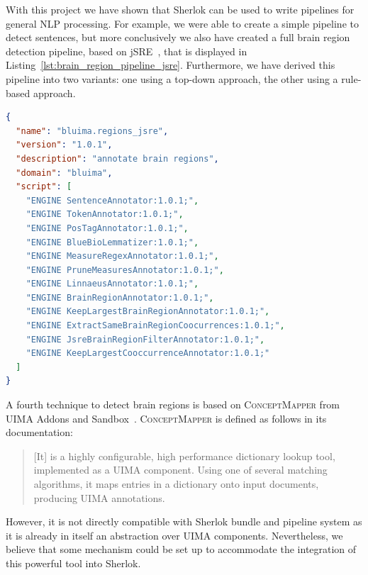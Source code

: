 \documentclass{article}
\newcommand{\ID}[1]{{\textsc{#1}}}
\begin{document}
With this project we have shown that Sherlok can be used to write pipelines for general NLP
processing. For example, we were able to create a simple pipeline to detect sentences, but more
conclusively we also have created a full brain region detection pipeline, based on
jSRE~\cite{jsre_2006}, that is displayed in Listing~\ref{lst:brain_region_pipeline_jsre}.
Furthermore, we have derived this pipeline into two variants: one using a top-down approach, the
other using a rule-based approach.

\begin{lstlisting}[float,language=json,
                   caption=jSRE brain region pipeline,
                   label=lst:brain_region_pipeline_jsre]
{
  "name": "bluima.regions_jsre",
  "version": "1.0.1",
  "description": "annotate brain regions",
  "domain": "bluima",
  "script": [
    "ENGINE SentenceAnnotator:1.0.1;",
    "ENGINE TokenAnnotator:1.0.1;",
    "ENGINE PosTagAnnotator:1.0.1;",
    "ENGINE BlueBioLemmatizer:1.0.1;",
    "ENGINE MeasureRegexAnnotator:1.0.1;",
    "ENGINE PruneMeasuresAnnotator:1.0.1;",
    "ENGINE LinnaeusAnnotator:1.0.1;",
    "ENGINE BrainRegionAnnotator:1.0.1;",
    "ENGINE KeepLargestBrainRegionAnnotator:1.0.1;",
    "ENGINE ExtractSameBrainRegionCoocurrences:1.0.1;",
    "ENGINE JsreBrainRegionFilterAnnotator:1.0.1;",
    "ENGINE KeepLargestCooccurrenceAnnotator:1.0.1;"
  ]
}
\end{lstlisting}

A fourth technique to detect brain regions is based on \ID{ConceptMapper} from UIMA Addons and
Sandbox~\cite{uima_sandbox}. \ID{ConceptMapper} is defined as follows in its documentation:

\begin{quotation}
    [It] is a highly configurable, high performance dictionary lookup tool, implemented as a UIMA
    component. Using one of several matching algorithms, it maps entries in a dictionary onto input
    documents, producing UIMA annotations.
\end{quotation}

However, it is not directly compatible with Sherlok bundle and pipeline system as it is already in
itself an abstraction over UIMA components. Nevertheless, we believe that some mechanism could be
set up to accommodate the integration of this powerful tool into Sherlok.
\end{document}
